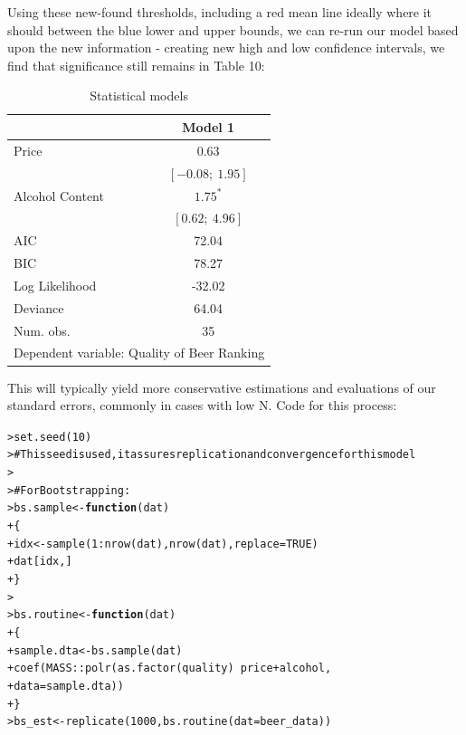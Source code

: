 \documentclass[12pt]{article}\usepackage[]{graphicx}\usepackage[]{color}
\makeatletter
\newcommand{\hlnum}[1]{\textcolor[rgb]{0.82,0.78,0.62}{#1}}%
\newcommand{\hlcom}[1]{\textcolor[rgb]{0.404,0.408,0.42}{#1}}%
\newcommand{\hlopt}[1]{\textcolor[rgb]{0.882,0.878,0.898}{#1}}%
\newcommand{\hlstd}[1]{\textcolor[rgb]{0.882,0.878,0.898}{#1}}%
\newcommand{\hlkwa}[1]{\textcolor[rgb]{0.384,0.675,0.808}{\textbf{#1}}}%
\newcommand{\hlkwb}[1]{\textcolor[rgb]{0.902,0.675,0.196}{#1}}%
\newcommand{\hlkwc}[1]{\textcolor[rgb]{0.812,0.522,0.388}{#1}}%
\newcommand{\hlkwd}[1]{\textcolor[rgb]{0.733,0.388,0.812}{#1}}%
\newenvironment{kframe}{%
 \def\at@end@of@kframe{}%
 \ifinner\ifhmode%
  \def\at@end@of@kframe{\end{minipage}}%
  \begin{minipage}{\columnwidth}%
 \fi\fi%
 \def\FrameCommand##1{\hskip\@totalleftmargin \hskip-\fboxsep
 \colorbox{shadecolor}{##1}\hskip-\fboxsep
     \hskip-\linewidth \hskip-\@totalleftmargin \hskip\columnwidth}%
 \MakeFramed {\advance\hsize-\width
   \@totalleftmargin\z@ \linewidth\hsize
   \@setminipage}}%
 {\par\unskip\endMakeFramed%
 \at@end@of@kframe}
\newenvironment{knitrout}{}{} %
\makeatother
\begin{document}
\begin{flushleft}
Using these new-found thresholds, including a red mean line ideally where it should between the blue lower and upper bounds, we can re-run our model based upon the new information - creating new high and low confidence intervals, we find that significance still remains in Table 10: \\

\begin{table}[h!]
\caption{Statistical models}
\begin{center}
\begin{tabular}{l c }
\hline
 & Model 1 \\
\hline
Price           & $0.63$           \\
                & $[-0.08;\ 1.95]$ \\
Alcohol Content & $1.75^{*}$       \\
                & $[0.62;\ 4.96]$  \\
\hline
AIC             & 72.04            \\
BIC             & 78.27            \\
Log Likelihood  & -32.02           \\
Deviance        & 64.04            \\
Num. obs.       & 35               \\
\hline
\multicolumn{2}{l}{\scriptsize{Dependent variable: Quality of Beer Ranking}}
\end{tabular}
\end{center}
\end{table}


This will typically yield more conservative estimations and evaluations of our standard errors, commonly in cases with low N. Code for this process:

\begin{knitrout}
\color{fgcolor}\begin{kframe}
\begin{alltt}
\hlstd{> }\hlkwd{set.seed}\hlstd{(}\hlnum{10}\hlstd{)}
\hlstd{> }\hlcom{# This seed is used, it assures replication and convergence for this model}
\hlstd{> }
\hlstd{> }\hlcom{# For Bootstrapping:}
\hlstd{> }\hlstd{bs.sample} \hlkwb{<-} \hlkwa{function}\hlstd{(}\hlkwc{dat}\hlstd{)}
\hlstd{+ }\hlstd{\{}
\hlstd{+ }  \hlstd{idx} \hlkwb{<-} \hlkwd{sample}\hlstd{(}\hlnum{1}\hlopt{:}\hlkwd{nrow}\hlstd{(dat),} \hlkwd{nrow}\hlstd{(dat),} \hlkwc{replace} \hlstd{=} \hlnum{TRUE}\hlstd{)}
\hlstd{+ }  \hlstd{dat[idx,]}
\hlstd{+ }\hlstd{\}}
\hlstd{> }
\hlstd{> }\hlstd{bs.routine} \hlkwb{<-} \hlkwa{function}\hlstd{(}\hlkwc{dat}\hlstd{)}
\hlstd{+ }\hlstd{\{}
\hlstd{+ }  \hlstd{sample.dta} \hlkwb{<-} \hlkwd{bs.sample}\hlstd{(dat)}
\hlstd{+ }  \hlkwd{coef}\hlstd{(MASS}\hlopt{::}\hlkwd{polr}\hlstd{(}\hlkwd{as.factor}\hlstd{(quality)} \hlopt{~} \hlstd{price} \hlopt{+} \hlstd{alcohol,}
\hlstd{+ }                  \hlkwc{data} \hlstd{= sample.dta))}
\hlstd{+ }\hlstd{\}}
\hlstd{> }\hlstd{bs_est} \hlkwb{<-} \hlkwd{replicate}\hlstd{(}\hlnum{1000}\hlstd{,} \hlkwd{bs.routine}\hlstd{(}\hlkwc{dat} \hlstd{= beer_data))}
\end{alltt}



\end{kframe}
\end{knitrout}
\end{flushleft}
\end{document}
